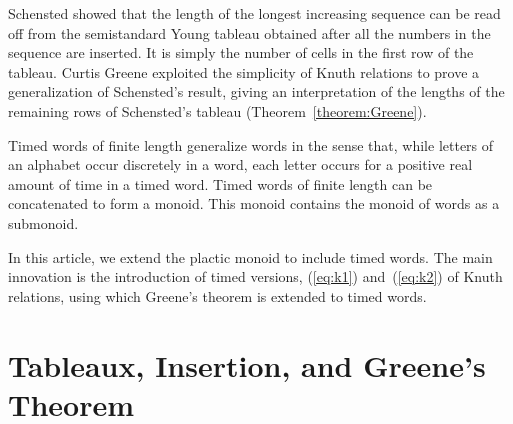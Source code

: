\documentclass[10pt]{amsproc}
\theoremstyle{definition}
\theoremstyle{remark}
\begin{document}
Schensted showed that the length of the longest increasing sequence can be read off from the semistandard Young tableau obtained after all the numbers in the sequence are inserted.
It is simply the number of cells in the first row of the tableau.
Curtis Greene \cite{Greene-schen} exploited the simplicity of Knuth relations to prove a generalization of Schensted's result, giving an interpretation of the lengths of the remaining rows of Schensted's tableau (Theorem~\ref{theorem:Greene}).

Timed words of finite length generalize words in the sense that, while letters of an alphabet occur discretely in a word, each letter occurs for a positive real amount of time in a timed word.
Timed words of finite length can be concatenated to form a monoid.
This monoid contains the monoid of words as a submonoid.

In this article, we extend the plactic monoid to include timed words.
The main innovation is the introduction of timed versions, (\ref{eq:k1}) and~(\ref{eq:k2}) of Knuth relations, using which Greene's theorem is extended to timed words.

\section{Tableaux, Insertion, and Greene's Theorem}
\label{sec:tabl-insert-green}
\end{document}
